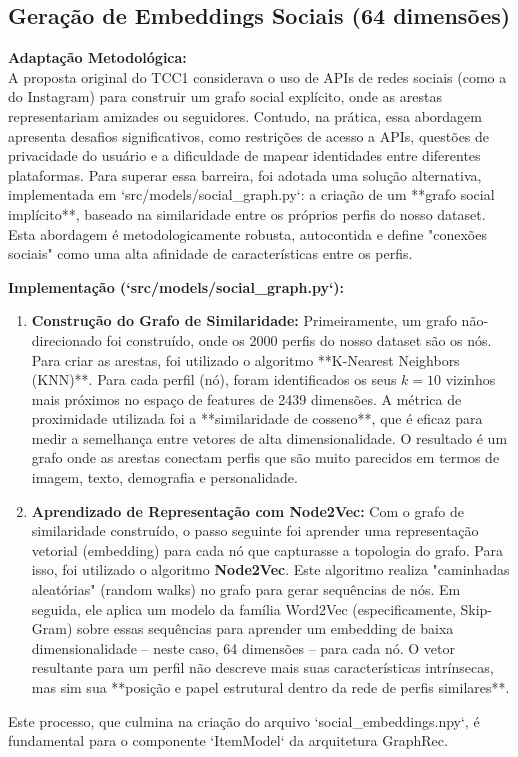 \subsection{Geração de Embeddings Sociais (64 dimensões)}
\textbf{Adaptação Metodológica:} \\
A proposta original do TCC1 considerava o uso de APIs de redes sociais (como a do Instagram) para construir um grafo social explícito, onde as arestas representariam amizades ou seguidores. Contudo, na prática, essa abordagem apresenta desafios significativos, como restrições de acesso a APIs, questões de privacidade do usuário e a dificuldade de mapear identidades entre diferentes plataformas. Para superar essa barreira, foi adotada uma solução alternativa, implementada em `src/models/social_graph.py`: a criação de um **grafo social implícito**, baseado na similaridade entre os próprios perfis do nosso dataset. Esta abordagem é metodologicamente robusta, autocontida e define "conexões sociais" como uma alta afinidade de características entre os perfis.

\textbf{Implementação (`src/models/social_graph.py`):}
\begin{enumerate}
    \item \textbf{Construção do Grafo de Similaridade:} Primeiramente, um grafo não-direcionado foi construído, onde os 2000 perfis do nosso dataset são os nós. Para criar as arestas, foi utilizado o algoritmo **K-Nearest Neighbors (KNN)**. Para cada perfil (nó), foram identificados os seus $k=10$ vizinhos mais próximos no espaço de features de 2439 dimensões. A métrica de proximidade utilizada foi a **similaridade de cosseno**, que é eficaz para medir a semelhança entre vetores de alta dimensionalidade. O resultado é um grafo onde as arestas conectam perfis que são muito parecidos em termos de imagem, texto, demografia e personalidade.
    \item \textbf{Aprendizado de Representação com Node2Vec:} Com o grafo de similaridade construído, o passo seguinte foi aprender uma representação vetorial (embedding) para cada nó que capturasse a topologia do grafo. Para isso, foi utilizado o algoritmo \textbf{Node2Vec}. Este algoritmo realiza "caminhadas aleatórias" (random walks) no grafo para gerar sequências de nós. Em seguida, ele aplica um modelo da família Word2Vec (especificamente, Skip-Gram) sobre essas sequências para aprender um embedding de baixa dimensionalidade -- neste caso, 64 dimensões -- para cada nó. O vetor resultante para um perfil não descreve mais suas características intrínsecas, mas sim sua **posição e papel estrutural dentro da rede de perfis similares**.
\end{enumerate}
Este processo, que culmina na criação do arquivo `social_embeddings.npy`, é fundamental para o componente `ItemModel` da arquitetura GraphRec.

